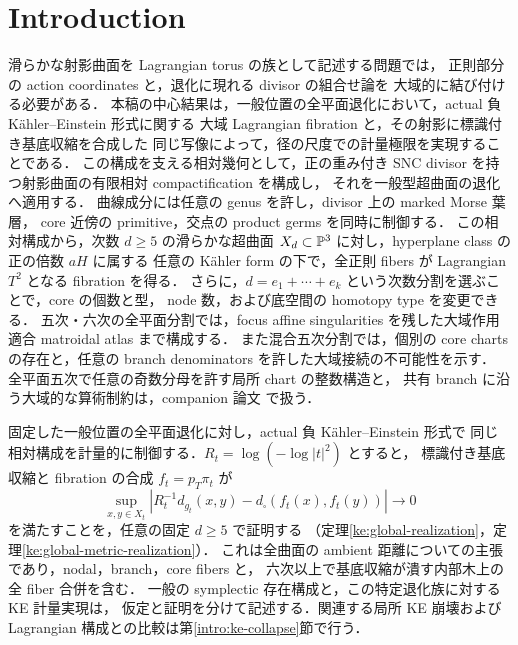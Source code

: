\section{Introduction}

滑らかな射影曲面を Lagrangian torus の族として記述する問題では，
正則部分の action coordinates と，退化に現れる divisor の組合せ論を
大域的に結び付ける必要がある．
本稿の中心結果は，一般位置の全平面退化において，actual 負 Kähler--Einstein 形式に関する
大域 Lagrangian fibration と，その射影に標識付き基底収縮を合成した
同じ写像によって，径の尺度での計量極限を実現することである．
この構成を支える相対幾何として，正の重み付き SNC divisor を持つ射影曲面の有限相対 compactification を構成し，
それを一般型超曲面の退化へ適用する．
曲線成分には任意の genus を許し，divisor 上の marked Morse 葉層，
core 近傍の primitive，交点の product germs を同時に制御する．
この相対構成から，次数 $d\geq5$ の滑らかな超曲面
$X_d\subset\mathbb P^3$ に対し，hyperplane class の正の倍数 $aH$ に属する
任意の Kähler form の下で，全正則 fibers が Lagrangian $T^2$ となる fibration を得る．
さらに，$d=e_1+\cdots+e_k$ という次数分割を選ぶことで，core の個数と型，
node 数，および底空間の homotopy type を変更できる．
五次・六次の全平面分割では，focus affine singularities を残した大域作用適合 matroidal atlas まで構成する．
また混合五次分割では，個別の core charts の存在と，任意の branch denominators を許した大域接続の不可能性を示す．
全平面五次で任意の奇数分母を許す局所 chart の整数構造と，
共有 branch に沿う大域的な算術制約は，companion 論文
\cite{QuinticArithmetic}で扱う．

固定した一般位置の全平面退化に対し，actual 負 Kähler--Einstein 形式で
同じ相対構成を計量的に制御する．$R_t=\log(-\log|t|^2)$ とすると，
標識付き基底収縮と fibration の合成 $f_t=p_T\pi_t$ が
\[
 \sup_{x,y\in X_t}
 \left|R_t^{-1}d_{g_t}(x,y)-d_\square(f_t(x),f_t(y))\right|\to0
\]
を満たすことを，任意の固定 $d\ge5$ で証明する
（定理\ref{ke:global-realization}，定理\ref{ke:global-metric-realization}）．
これは全曲面の ambient 距離についての主張であり，nodal，branch，core fibers と，
六次以上で基底収縮が潰す内部木上の全 fiber 合併を含む．
一般の symplectic 存在構成と，この特定退化族に対する KE 計量実現は，
仮定と証明を分けて記述する．関連する局所 KE 崩壊および
Lagrangian 構成との比較は第\ref{intro:ke-collapse}節で行う．


